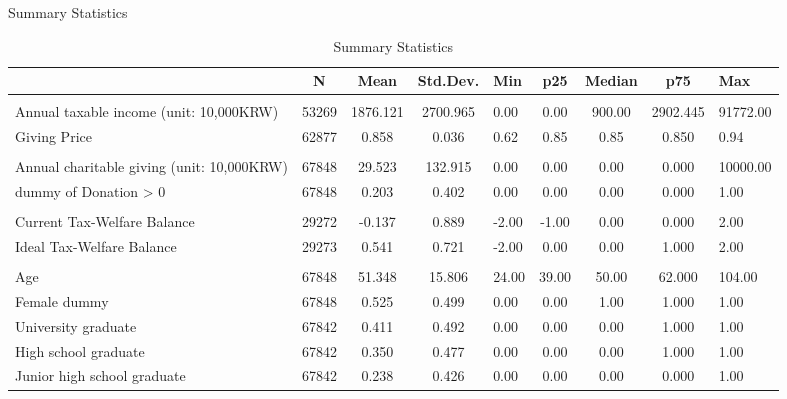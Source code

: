 \documentclass[
  ignorenonframetext,
]{beamer}
\begin{document}
\begin{frame}{Summary Statistics}
\protect\hypertarget{summary-statistics}{}
\begin{table}

\caption{\label{tab:SummaryCovariate}Summary Statistics}
\centering
\fontsize{7}{9}\selectfont
\begin{tabular}[t]{lccclcccl}
\toprule
 & N & Mean & Std.Dev. & Min & p25 & Median & p75 & Max\\
\midrule
\addlinespace[0.3em]
\multicolumn{9}{l}{\textbf{Income and Giving Price}}\\
\hspace{1em}Annual taxable income (unit: 10,000KRW) & 53269 & 1876.121 & 2700.965 & 0.00 & 0.00 & 900.00 & 2902.445 & 91772.00\\
\hspace{1em}Giving Price & 62877 & 0.858 & 0.036 & 0.62 & 0.85 & 0.85 & 0.850 & 0.94\\
\addlinespace[0.3em]
\multicolumn{9}{l}{\textbf{Charitable Donations}}\\
\hspace{1em}Annual charitable giving (unit: 10,000KRW) & 67848 & 29.523 & 132.915 & 0.00 & 0.00 & 0.00 & 0.000 & 10000.00\\
\hspace{1em}dummy of Donation > 0 & 67848 & 0.203 & 0.402 & 0.00 & 0.00 & 0.00 & 0.000 & 1.00\\
\addlinespace[0.3em]
\multicolumn{9}{l}{\textbf{Government Efficiency}}\\
\hspace{1em}Current Tax-Welfare Balance & 29272 & -0.137 & 0.889 & -2.00 & -1.00 & 0.00 & 0.000 & 2.00\\
\hspace{1em}Ideal Tax-Welfare Balance & 29273 & 0.541 & 0.721 & -2.00 & 0.00 & 0.00 & 1.000 & 2.00\\
\addlinespace[0.3em]
\multicolumn{9}{l}{\textbf{Individual Characteristics}}\\
\hspace{1em}Age & 67848 & 51.348 & 15.806 & 24.00 & 39.00 & 50.00 & 62.000 & 104.00\\
\hspace{1em}Female dummy & 67848 & 0.525 & 0.499 & 0.00 & 0.00 & 1.00 & 1.000 & 1.00\\
\hspace{1em}University graduate & 67842 & 0.411 & 0.492 & 0.00 & 0.00 & 0.00 & 1.000 & 1.00\\
\hspace{1em}High school graduate & 67842 & 0.350 & 0.477 & 0.00 & 0.00 & 0.00 & 1.000 & 1.00\\
\hspace{1em}Junior high school graduate & 67842 & 0.238 & 0.426 & 0.00 & 0.00 & 0.00 & 0.000 & 1.00\\
\bottomrule
\end{tabular}
\end{table}
\end{frame}
\end{document}
